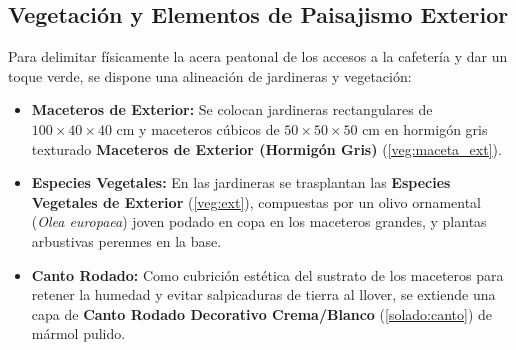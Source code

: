 \subsection{Vegetación y Elementos de Paisajismo Exterior}
Para delimitar físicamente la acera peatonal de los accesos a la cafetería y dar un toque verde, se dispone una alineación de jardineras y vegetación:
\begin{itemize}
    \item \textbf{Maceteros de Exterior:} Se colocan jardineras rectangulares de $100\times40\times40$ cm y maceteros cúbicos de $50\times50\times50$ cm en hormigón gris texturado \textbf{Maceteros de Exterior (Hormigón Gris)} (\ref{veg:maceta_ext}).
    \item \textbf{Especies Vegetales:} En las jardineras se trasplantan las \textbf{Especies Vegetales de Exterior} (\ref{veg:ext}), compuestas por un olivo ornamental (\textit{Olea europaea}) joven podado en copa en los maceteros grandes, y plantas arbustivas perennes en la base.
    \item \textbf{Canto Rodado:} Como cubrición estética del sustrato de los maceteros para retener la humedad y evitar salpicaduras de tierra al llover, se extiende una capa de \textbf{Canto Rodado Decorativo Crema/Blanco} (\ref{solado:canto}) de mármol pulido.
\end{itemize}

